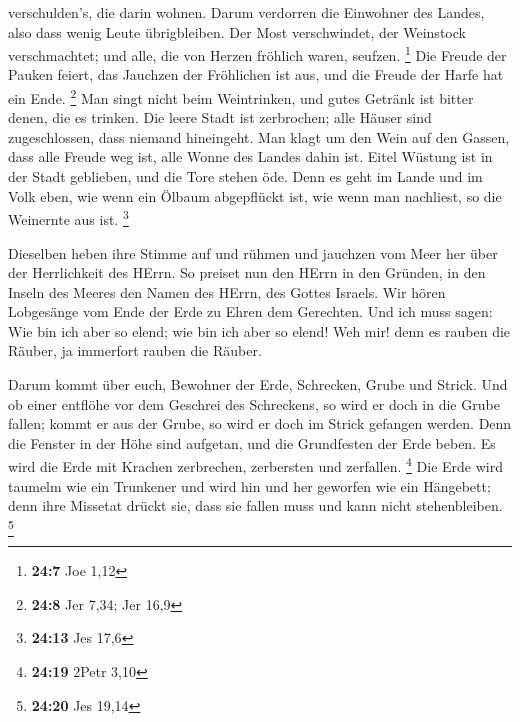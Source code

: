 verschulden's, die darin wohnen. Darum verdorren die Einwohner des
Landes, also dass wenig Leute übrigbleiben.  Der Most
verschwindet, der Weinstock verschmachtet; und alle, die von Herzen
fröhlich waren, seufzen. \footnote{\textbf{24:7} Joe 1,12} 
Die Freude der Pauken feiert, das Jauchzen der Fröhlichen ist aus, und
die Freude der Harfe hat ein Ende. \footnote{\textbf{24:8} Jer 7,34; Jer
  16,9}  Man singt nicht beim Weintrinken, und gutes Getränk
ist bitter denen, die es trinken.  Die leere Stadt ist
zerbrochen; alle Häuser sind zugeschlossen, dass niemand hineingeht.
 Man klagt um den Wein auf den Gassen, dass alle Freude weg
ist, alle Wonne des Landes dahin ist.  Eitel Wüstung ist in
der Stadt geblieben, und die Tore stehen öde.  Denn es geht
im Lande und im Volk eben, wie wenn ein Ölbaum abgepflückt ist, wie wenn
man nachliest, so die Weinernte aus ist. \footnote{\textbf{24:13} Jes
  17,6}

 Dieselben heben ihre Stimme auf und rühmen und jauchzen
vom Meer her über der Herrlichkeit des HErrn.  So preiset
nun den HErrn in den Gründen, in den Inseln des Meeres den Namen des
HErrn, des Gottes Israels.  Wir hören Lobgesänge vom Ende
der Erde zu Ehren dem Gerechten. Und ich muss sagen: Wie bin ich aber so
elend; wie bin ich aber so elend! Weh mir! denn es rauben die Räuber, ja
immerfort rauben die Räuber.

 Darum kommt über euch, Bewohner der Erde, Schrecken, Grube
und Strick.  Und ob einer entflöhe vor dem Geschrei des
Schreckens, so wird er doch in die Grube fallen; kommt er aus der Grube,
so wird er doch im Strick gefangen werden. Denn die Fenster in der Höhe
sind aufgetan, und die Grundfesten der Erde beben.  Es wird
die Erde mit Krachen zerbrechen, zerbersten und zerfallen. \footnote{\textbf{24:19}
  2Petr 3,10}  Die Erde wird taumelm wie ein Trunkener und
wird hin und her geworfen wie ein Hängebett; denn ihre Missetat drückt
sie, dass sie fallen muss und kann nicht stehenbleiben. \footnote{\textbf{24:20}
  Jes 19,14}

